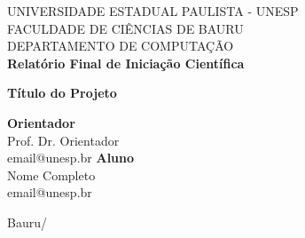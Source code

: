 \begin{titlepage}

\begin{center}
    {\large \sc UNIVERSIDADE ESTADUAL PAULISTA - UNESP} \\
    {\large \sc FACULDADE DE CIÊNCIAS DE BAURU}\\[0.7cm]
    {\small \sc DEPARTAMENTO DE COMPUTAÇÃO}\\[2.8cm]
    
    {\bf \large Relatório Final de Iniciação Científica}  
    
    \vspace{3cm}
    
    {\bf \large Título do Projeto}
    
    \vspace{4cm}
    
    \vfill
        {\large  \bf Orientador} \\ 
        {\large Prof. Dr. Orientador} \\ 
        {\large email@unesp.br} 
    \vfill
        {\large  \bf Aluno} \\
        {\large Nome Completo} \\
        {\large email@unesp.br} 
        
    \vfill
    
     \begin{center}
        \makeatletter
        Bauru/\@date
        \makeatother
    \end{center}
\end{center}
\pagebreak
\end{titlepage}

